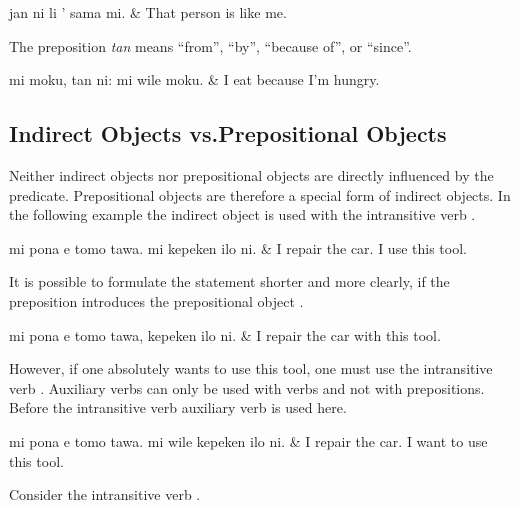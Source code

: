 \begin{translationtable}
    jan ni li ' sama mi. & That person is like me. \\
\end{translationtable}
%
The preposition \textit{tan} means ``from'', ``by'', ``because of'', or ``since''.

\begin{translationtable}
    mi moku, tan ni: mi wile moku. & I eat because I'm hungry. \\
\end{translationtable}

\subsection*{Indirect Objects vs.\@ Prepositional Objects}
Neither indirect objects nor prepositional objects are directly influenced by the predicate.
Prepositional objects are therefore a special form of indirect objects.
In the following example the indirect object  is used with the intransitive verb .

\begin{translationtable}
    mi pona e tomo tawa. mi kepeken ilo ni. & I repair the car. I use this tool. \\
\end{translationtable}
%
It is possible to formulate the statement shorter and more clearly, if the preposition  introduces the prepositional object .

\begin{translationtable}
    mi pona e tomo tawa, kepeken ilo ni. & I repair the car with this tool. \\
\end{translationtable}
%
However, if one absolutely wants to use this tool, one must use the intransitive verb .
Auxiliary verbs can only be used with verbs and not with prepositions.
Before the intransitive verb  auxiliary verb  is used here.

\begin{translationtable}
    mi pona e tomo tawa. mi wile kepeken ilo ni. & I repair the car. I want to use this tool. \\
\end{translationtable}
%
%
%
%
Consider the intransitive verb .

